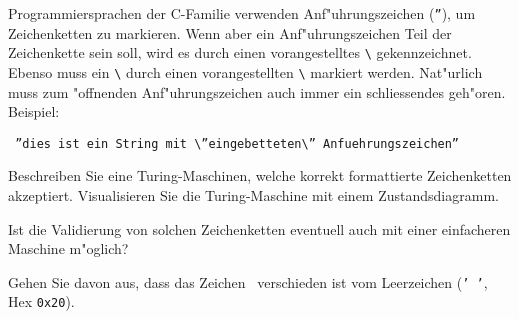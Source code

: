 Programmiersprachen der C-Familie verwenden Anf"uhrungszeichen
({\tt\textquotedblright}), um Zeichenketten zu markieren.
Wenn aber ein Anf"uhrungszeichen Teil der
Zeichenkette sein soll, wird es durch einen vorangestelltes {\tt\textbackslash}
gekennzeichnet.
Ebenso muss ein {\tt\textbackslash} durch einen vorangestellten {\tt\textbackslash}
markiert werden. Nat"urlich muss zum "offnenden Anf"uhrungszeichen
auch immer ein schliessendes geh"oren. Beispiel:
\begin{center}
\tt
\textquotedblright dies ist ein String mit \textbackslash\textquotedblright eingebetteten\textbackslash\textquotedblright\ Anfuehrungszeichen\textquotedblright
\end{center}
\begin{teilaufgaben}
\item
Beschreiben Sie eine Turing-Maschinen, welche korrekt formattierte
Zeichenketten akzeptiert. Visualisieren Sie die Turing-Maschine mit
einem Zustandsdiagramm.
\item
Ist die Validierung von solchen Zeichenketten eventuell auch mit einer
einfacheren Maschine m"oglich?
\end{teilaufgaben}


\begin{hinweis}
Gehen Sie davon aus, dass das Zeichen \blank\ verschieden ist
vom Leerzeichen ({\tt ' '}, Hex {\tt 0x20}).
\end{hinweis}

